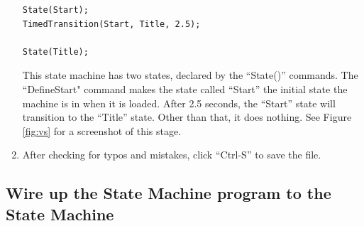 \documentclass[letter,12pt]{article}
\begin{document}
\begin{enumerate}
\begin{verbatim}
State(Start);
TimedTransition(Start, Title, 2.5);

State(Title);
\end{verbatim}

This state machine has two states, declared by the “State()” commands.   The “DefineStart" command makes the state called “Start” the initial state the machine is in when it is loaded.  After 2.5 seconds, the “Start” state will transition to the “Title” state.  Other than that, it does nothing.  See Figure \ref{fig:vs} for a screenshot of this stage.

\item After checking for typos and mistakes, click “Ctrl-S” to save the file.

\end{enumerate}

\subsection{Wire up the State Machine program to the State Machine}
\end{document}
